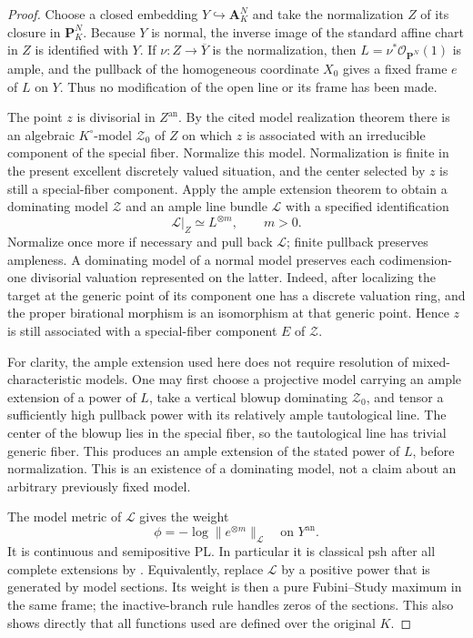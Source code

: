 \documentclass[11pt,a4paper]{article}
\numberwithin{equation}{section}
\theoremstyle{definition}
\theoremstyle{remark}
\begin{document}
\begin{proof}
Choose a closed embedding $Y\hookrightarrow\mathbf A^N_K$ and take
the normalization $Z$ of its closure in $\mathbf P^N_K$. Because $Y$
is normal, the inverse image of the standard affine chart in $Z$ is
identified with $Y$. If $\nu:Z\to\overline Y$ is the normalization,
then $L=\nu^*\mathcal O_{\mathbf P^N}(1)$ is ample, and the pullback
of the homogeneous coordinate $X_0$ gives a fixed frame $e$ of $L$
on $Y$. Thus no modification of the open line or its frame has been
made.

The point $z$ is divisorial in $Z^{\mathrm{an}}$. By the cited model
realization theorem there is an algebraic $K^\circ$-model
$\mathscr Z_0$ of $Z$ on which $z$ is associated with an irreducible
component of the special fiber. Normalize this model. Normalization is
finite in the present excellent discretely valued situation, and the
center selected by $z$ is still a special-fiber component. Apply the
ample extension theorem to obtain a dominating model $\mathscr Z$
and an ample line bundle $\mathscr L$ with a specified identification
\[
 \mathscr L|_Z\simeq L^{\otimes m},\qquad m>0.
\]
Normalize once more if necessary and pull back $\mathscr L$; finite
pullback preserves ampleness. A dominating model of a normal model
preserves each codimension-one divisorial valuation represented on the
latter. Indeed, after localizing the target at the generic point of
its component one has a discrete valuation ring, and the proper
birational morphism is an isomorphism at that generic point. Hence $z$
is still associated with a special-fiber component $E$ of
$\mathscr Z$.

For clarity, the ample extension used here does not require resolution
of mixed-characteristic models. One may first choose a projective
model carrying an ample extension of a power of $L$, take a vertical
blowup dominating $\mathscr Z_0$, and tensor a sufficiently high
pullback power with its relatively ample tautological line. The center
of the blowup lies in the special fiber, so the tautological line has
trivial generic fiber. This produces an ample extension of the stated
power of $L$, before normalization. This is an existence of a
dominating model, not a claim about an arbitrary previously fixed
model.

The model metric of $\mathscr L$ gives the weight
\[
 \phi=-\log\|e^{\otimes m}\|_{\mathscr L}
 \quad\text{on }Y^{\mathrm{an}}.
\]
It is continuous and semipositive PL. In particular it is classical
psh after all complete extensions by
\cite[Theorem~4.3, pp.~22--23]{GR25}. Equivalently, replace
$\mathscr L$ by a positive power that is generated by model sections.
Its weight is then a pure Fubini--Study maximum in the same frame;
the inactive-branch rule handles zeros of the sections. This also
shows directly that all functions used are defined over the original
$K$.


\end{proof}
\end{document}
